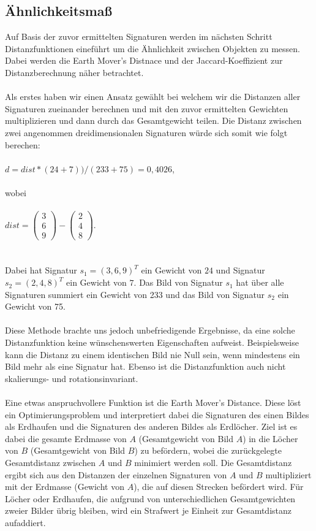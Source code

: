 \documentclass{scrartcl}
\begin{document}
\subsection{Ähnlichkeitsmaß}
Auf Basis der zuvor ermittelten Signaturen werden im nächsten Schritt Distanzfunktionen eineführt um die Ähnlichkeit zwischen Objekten zu messen. Dabei werden die Earth Mover's Distnace und der Jaccard-Koeffizient zur Distanzberechnung näher betrachtet.
\\
\\
Als erstes haben wir einen Ansatz gewählt bei welchem wir die Distanzen aller Signaturen zueinander berechnen und mit den zuvor ermittelten Gewichten multiplizieren und dann durch das Gesamtgewicht teilen. Die Distanz zwischen zwei angenommen dreidimensionalen Signaturen würde sich somit wie folgt berechen: 
\\
\\
$d = dist * (24 + 7))/ (233 + 75) = 0,4026$,
\\
\\
wobei 
\\
\\
$dist = \left( \begin{array}{c} 3 \\ 6 \\ 9 \end{array}\right) - \left( \begin{array}{c} 2 \\ 4 \\ 8 \end{array}\right)$.
\\ 
\\
\\
Dabei hat Signatur $s_{1} = (3,6,9)^{T}$ ein Gewicht von $24$ und Signatur $s_{2} = (2,4,8)^{T}$ ein Gewicht von $7$. Das Bild von Signatur $s_{1}$ hat über alle Signaturen summiert ein Gewicht von 233 und das Bild von Signatur $s_{2}$ ein Gewicht von 75.
\\
\\
Diese Methode brachte uns jedoch unbefriedigende Ergebnisse, da eine solche Distanzfunktion keine wünschenswerten  Eigenschaften aufweist. Beispielsweise kann die Distanz zu einem identischen Bild nie Null sein, wenn mindestens ein Bild mehr als eine Signatur hat. Ebenso ist die Distanzfunktion auch nicht skalierungs- und rotationsinvariant. 
\\
\\ 
Eine etwas anspruchvollere Funktion ist die Earth Mover's Distance. Diese löst ein Optimierungsproblem und interpretiert dabei  die Signaturen des einen Bildes als Erdhaufen und die Signaturen des anderen Bildes als Erdlöcher. Ziel ist es dabei die gesamte Erdmasse von $A$ (Gesamtgewicht von Bild $A$) in die Löcher von $B$ (Gesamtgewicht von Bild $B$) zu befördern, wobei die zurückgelegte Gesamtdistanz zwischen $A$ und $B$ minimiert werden soll. Die Gesamtdistanz ergibt sich aus den Distanzen der einzelnen Signaturen von $A$ und $B$ multipliziert mit der Erdmasse (Gewicht von $A$), die auf diesen Strecken befördert wird. Für Löcher oder Erdhaufen, die aufgrund von unterschiedlichen Gesamtgewichten zweier Bilder übrig bleiben, wird ein Strafwert je Einheit zur Gesamtdistanz aufaddiert.
\end{document}
